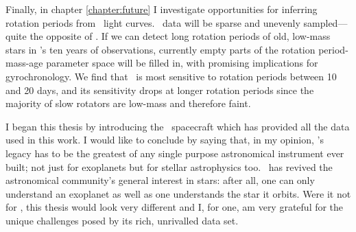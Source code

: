 Finally, in chapter \ref{chapter:future} I investigate opportunities for
inferring rotation periods from \LSST\ light curves.
\LSST\ data will be sparse and unevenly sampled---quite the opposite of
\kepler.
If we can detect long rotation periods of old, low-mass stars in \LSST's ten
years of observations, currently empty parts of the rotation period-mass-age
parameter space will be filled in, with promising implications for
gyrochronology.
We find that \LSST\ is most sensitive to rotation periods between 10 and 20
days, and its sensitivity drops at longer rotation periods since the majority
of slow rotators are low-mass and therefore faint.

I began this thesis by introducing the \kepler\ spacecraft which has provided
all the data used in this work.
I would like to conclude by saying that, in my opinion, \kepler's legacy has
to be the greatest of any single purpose astronomical instrument ever built;
not just for exoplanets but for stellar astrophysics too.
\kepler\ has revived the astronomical community's general interest in stars:
after all, one can only understand an exoplanet as well as one understands the
star it orbits.
Were it not for \kepler, this thesis would look very different and I, for one,
am very grateful for the unique challenges posed by its rich, unrivalled data
set.
